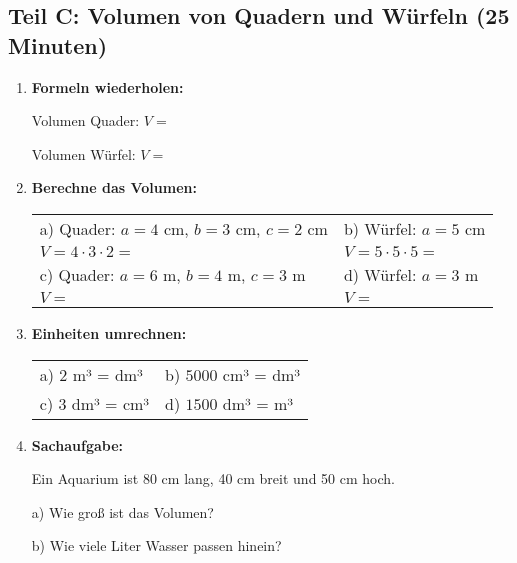 \subsection*{Teil C: Volumen von Quadern und Würfeln (25 Minuten)}

\begin{enumerate}[label=\arabic*.]
    \item \textbf{Formeln wiederholen:}
    \vspace{0.5cm}

    Volumen Quader: $V = $ \underline{\hspace{4cm}}

    Volumen Würfel: $V = $ \underline{\hspace{4cm}}

    \vspace{1cm}

    \item \textbf{Berechne das Volumen:}
    \vspace{0.5cm}

    \begin{tabular}{ll}
        a) Quader: $a = 4$ cm, $b = 3$ cm, $c = 2$ cm & b) Würfel: $a = 5$ cm \\[2ex]
        $V = 4 \cdot 3 \cdot 2 = $ \underline{\hspace{3cm}} & $V = 5 \cdot 5 \cdot 5 = $ \underline{\hspace{3cm}} \\[4ex]
        c) Quader: $a = 6$ m, $b = 4$ m, $c = 3$ m & d) Würfel: $a = 3$ m \\[2ex]
        $V = $ \underline{\hspace{4cm}} & $V = $ \underline{\hspace{4cm}}
    \end{tabular}

    \vspace{1cm}

    \item \textbf{Einheiten umrechnen:}
    \vspace{0.5cm}

    \begin{tabular}{ll}
        a) $2$ m³ = \underline{\hspace{3cm}} dm³ & b) $5000$ cm³ = \underline{\hspace{3cm}} dm³ \\[2ex]
        c) $3$ dm³ = \underline{\hspace{3cm}} cm³ & d) $1500$ dm³ = \underline{\hspace{3cm}} m³
    \end{tabular}

    \vspace{1cm}

    \item \textbf{Sachaufgabe:}

    Ein Aquarium ist 80 cm lang, 40 cm breit und 50 cm hoch.

    a) Wie groß ist das Volumen? \underline{\hspace{4cm}}

    b) Wie viele Liter Wasser passen hinein? \underline{\hspace{4cm}}

\end{enumerate}